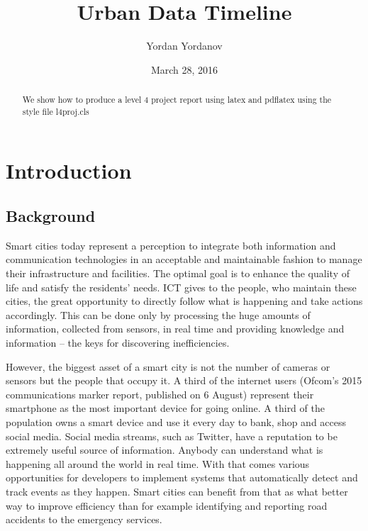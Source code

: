 \documentclass{l4proj}
\begin{document}
\title{Urban Data Timeline}
\author{Yordan Yordanov}
\date{March 28, 2016}
\maketitle

\begin{abstract}
We show how to produce a level 4 project report using latex and pdflatex using the 
style file l4proj.cls
\end{abstract}

\educationalconsent
%
%
\tableofcontents

\chapter{Introduction}

\section{Background}

Smart cities today represent a perception to integrate both information and communication technologies in an acceptable and maintainable fashion to manage their infrastructure and facilities. The optimal goal is to enhance the quality of life and satisfy the residents’ needs. ICT gives to the people, who maintain these cities, the great opportunity to directly follow what is happening and take actions accordingly. This can be done only by processing the huge amounts of information, collected from sensors, in real time and providing knowledge and information – the keys for discovering inefficiencies. 

However, the biggest asset of a smart city is not the number of cameras or sensors but the people that occupy it. A third of the internet users (Ofcom’s 2015 communications marker report, published on 6 August) represent their smartphone as the most important device for going online. A third of the population owns a smart device and use it every day to bank, shop and access social media. Social media streams, such as Twitter, have a reputation to be extremely useful source of information. Anybody can understand what is happening all around the world in real time. With that comes various opportunities for developers to implement systems that automatically detect and track events as they happen. Smart cities can benefit from that as what better way to improve efficiency than for example identifying and reporting road accidents to the emergency services.
\end{document}
